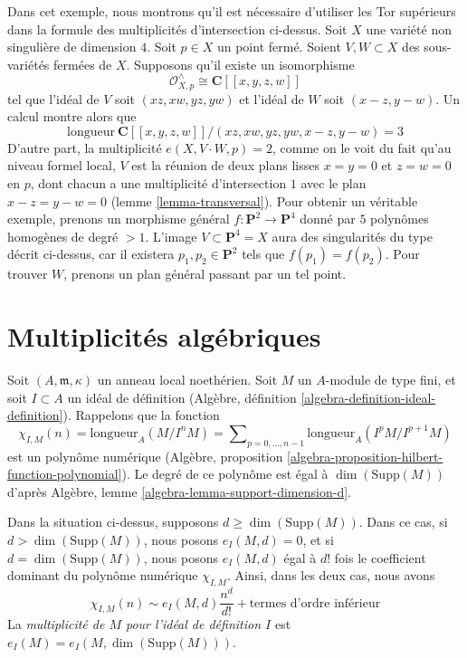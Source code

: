 \begin{example}
\label{example-naive-multiplicity-wrong}
Dans cet exemple, nous montrons qu'il est nécessaire d'utiliser les
Tor supérieurs dans la formule des multiplicités d'intersection ci-dessus.
Soit $X$ une variété non singulière de dimension $4$.
Soit $p \in X$ un point fermé. Soient $V, W \subset X$
des sous-variétés fermées de $X$. Supposons qu'il existe un
isomorphisme
$$
\mathcal{O}_{X, p}^\wedge \cong \mathbf{C}[[x, y, z, w]]
$$
tel que l'idéal de $V$ soit $(xz, xw, yz, yw)$ et l'idéal
de $W$ soit $(x - z, y - w)$. Un calcul montre alors que
$$
\text{longueur}\ \mathbf{C}[[x, y, z, w]]/
(xz, xw, yz, yw, x - z, y - w) = 3
$$
D'autre part, la multiplicité $e(X, V \cdot W, p) = 2$,
comme on le voit du fait qu'au niveau formel local, $V$ est la
réunion de deux plans lisses $x = y = 0$ et $z = w = 0$ en $p$,
dont chacun a une multiplicité d'intersection $1$ avec le plan
$x - z = y - w = 0$ (lemme \ref{lemma-transversal}). Pour obtenir un
véritable exemple, prenons
un morphisme général $f : \mathbf{P}^2 \to \mathbf{P}^4$ donné par
$5$ polynômes homogènes de degré $> 1$. L'image
$V \subset \mathbf{P}^4 = X$ aura des singularités du type
décrit ci-dessus, car il existera $p_1, p_2 \in \mathbf{P}^2$
tels que $f(p_1) = f(p_2)$. Pour trouver $W$, prenons un plan général passant
par un tel point.
\end{example}






\section{Multiplicités algébriques}
\label{section-multiplicities}

\noindent
Soit $(A, \mathfrak m, \kappa)$ un anneau local noethérien.
Soit $M$ un $A$-module de type fini, et soit $I \subset A$ un idéal
de définition (Algèbre, définition \ref{algebra-definition-ideal-definition}).
Rappelons que la fonction
$$
\chi_{I, M}(n) = \text{longueur}_A(M/I^nM) =
\sum\nolimits_{p = 0, \ldots, n - 1} \text{longueur}_A(I^pM/I^{p + 1}M)
$$
est un polynôme numérique
(Algèbre, proposition \ref{algebra-proposition-hilbert-function-polynomial}).
Le degré de ce polynôme est égal à $\dim(\text{Supp}(M))$ d'après
Algèbre, lemme \ref{algebra-lemma-support-dimension-d}.

\begin{definition}
\label{definition-multiplicity}
Dans la situation ci-dessus, supposons $d \geq \dim(\text{Supp}(M))$.
Dans ce cas, si $d > \dim(\text{Supp}(M))$, nous posons $e_I(M, d) = 0$,
et si $d = \dim(\text{Supp}(M))$, nous posons $e_I(M, d)$ égal à $d!$
fois le coefficient dominant du polynôme numérique $\chi_{I, M}$.
Ainsi, dans les deux cas, nous avons
$$
\chi_{I, M}(n) \sim e_I(M, d) \frac{n^d}{d!} + \text{termes d'ordre inférieur}
$$
La {\it multiplicité de $M$ pour l'idéal de définition $I$}
est $e_I(M) = e_I(M, \dim(\text{Supp}(M)))$.
\end{definition}

